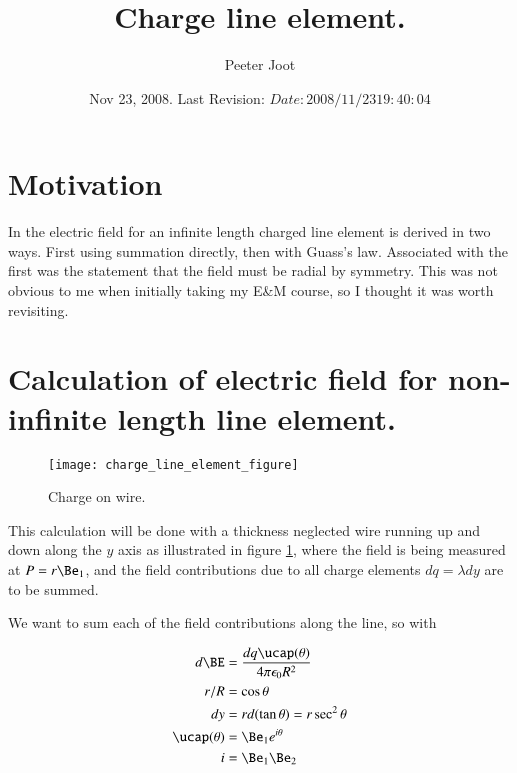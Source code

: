 \documentclass{article}
\title{ Charge line element. }
\author{Peeter Joot}
\date{ Nov 23, 2008.  Last Revision: $Date: 2008/11/23 19:40:04 $ }
\begin{document}
\maketitle{}

\section{Motivation}

In \cite{purcell1963eam} the electric field for an infinite length charged line element is derived in two ways.  First using summation directly, then with Guass's law.  Associated with the first was the statement that the field must be radial by symmetry.  This was not obvious to me when initially taking my E\&M course, so I thought it was worth revisiting.

\section{ Calculation of electric field for non-infinite length line element. }

\begin{figure}[htp]
\centering
\texttt{[image: charge\_line\_element\_figure]}
\caption{Charge on wire.}\label{fig:chargeLineElement}
\end{figure}

This calculation will be done with a thickness neglected wire running up and down along the $y$ axis as illustrated 
in figure \ref{fig:chargeLineElement}, where the field is being measured at $P = r \Be_1$, and the field contributions
due to all charge elements $dq = \lambda dy$ are to be summed.

We want to sum each of the field contributions along the line, so with

\begin{align*}
d\BE &= \frac{dq \ucap(\theta)}{4 \pi \epsilon_0 R^2} \\
r/R &= \cos\theta \\
dy &= r d(\tan\theta) = r \sec^2 \theta \\
\ucap(\theta) &= \Be_1 e^{i \theta} \\
i &= \Be_1 \Be_2 
\end{align*}

%
\end{document}
